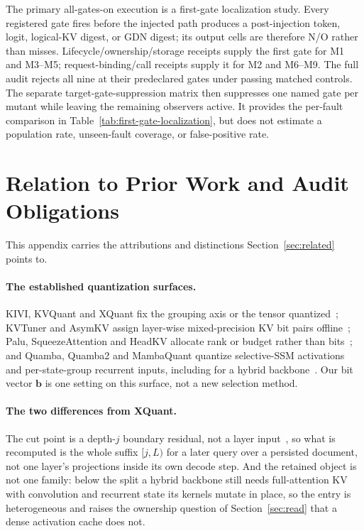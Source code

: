 \documentclass{article}
\begin{document}
The primary all-gates-on execution is a first-gate localization study. Every
registered gate fires before the injected path produces a post-injection
token, logit, logical-KV digest, or GDN digest; its output cells are therefore
N/O rather than misses. Lifecycle/ownership/storage receipts supply the first
gate for M1 and M3--M5; request-binding/call receipts supply it for M2 and
M6--M9. The full audit rejects all nine at their predeclared gates under
passing matched controls. The separate target-gate-suppression matrix then
suppresses one named gate per mutant while leaving the remaining observers
active. It provides the per-fault comparison in
Table~\ref{tab:first-gate-localization}, but does not estimate a population
rate, unseen-fault coverage, or false-positive rate.

\section{Relation to Prior Work and Audit Obligations}
\label{app:novelty-boundary}

This appendix carries the attributions and distinctions Section~\ref{sec:related}
points to.

\paragraph{The established quantization surfaces.}
KIVI, KVQuant and XQuant fix the grouping axis or the tensor
quantized~\citep{liu2024kivi,hooper2024kvquant,tomar2025xquant}; KVTuner and
AsymKV assign layer-wise mixed-precision KV bit pairs
offline~\citep{li2025kvtuner,tao2025asymkv,yang2024mikv}; Palu, SqueezeAttention
and HeadKV allocate rank or budget rather than
bits~\citep{chang2025palu,wang2025squeezeattention,fu2025headkv}; and Quamba,
Quamba2 and MambaQuant quantize selective-SSM activations and per-state-group
recurrent inputs, including for a hybrid
backbone~\citep{chiang2025quamba,chiang2025quamba2,yue2025mambaquant}.  Our bit
vector $\mathbf b$ is one setting on this surface, not a new selection method.

\paragraph{The two differences from XQuant.}
The cut point is a depth-$j$ boundary residual, not a layer
input~\citep{tomar2025xquant}, so what is recomputed is the whole suffix $[j,L)$
for a later query over a persisted document, not one layer's projections inside
its own decode step.  And the retained object is not one family: below the split
a hybrid backbone still needs full-attention KV with convolution and recurrent
state its kernels mutate in place, so the entry is heterogeneous and raises the
ownership question of Section~\ref{sec:read} that a dense activation cache does
not.
\end{document}
